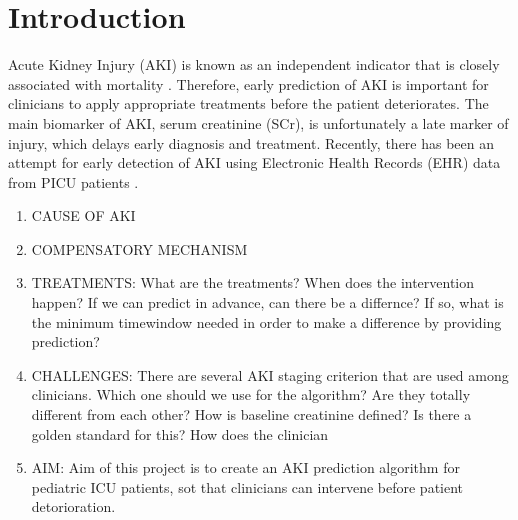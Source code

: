 \documentclass[
   technote
]{phildoc}
\begin{document}
\Tnotefrontmatter
\Large

\chapter{Introduction}
\label{Introdution}
Acute Kidney Injury (AKI) is known as an independent indicator that is closely associated with mortality \cite{sanchez2015association}. Therefore, early prediction of AKI is important for clinicians to apply appropriate treatments before the patient deteriorates. The main biomarker of AKI, serum creatinine (SCr), is unfortunately a late marker of injury, which delays early diagnosis and treatment. Recently, there has been an attempt for early detection of AKI using Electronic Health Records (EHR) data from PICU patients \cite{sanchez2016development}.
\begin{enumerate}
\item CAUSE OF AKI
\item COMPENSATORY MECHANISM
\item TREATMENTS: What are the treatments? When does the intervention happen? If we can predict in advance, can there be a differnce? If so, what is the  minimum timewindow needed in order to make a difference by providing prediction?
\item CHALLENGES: There are several AKI staging criterion that are used among clinicians. Which one should we use for the algorithm? Are they totally different from each other? How is baseline creatinine defined? Is there a golden standard for this? How does the clinician
\item AIM: Aim of this project is to create an AKI prediction algorithm for pediatric ICU patients, sot that clinicians can intervene before patient detorioration. 
\end{enumerate}
\end{document}
